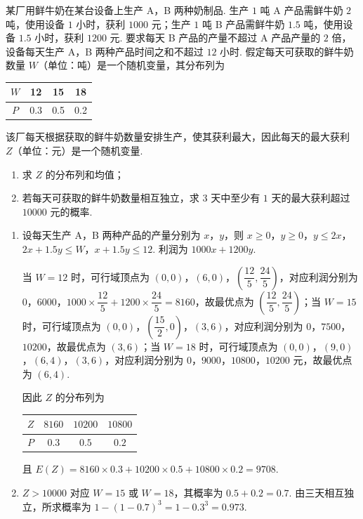 \begin{problem}
某厂用鲜牛奶在某台设备上生产 A，B 两种奶制品. 生产 \(1\) 吨 A 产品需鲜牛奶 \(2\) 吨，使用设备 \(1\) 小时，获利 \(1000\) 元；生产 \(1\) 吨 B 产品需鲜牛奶 \(1.5\) 吨，使用设备 \(1.5\) 小时，获利 \(1200\) 元. 要求每天 B 产品的产量不超过 A 产品产量的 \(2\) 倍，设备每天生产 A，B 两种产品时间之和不超过 \(12\) 小时. 假定每天可获取的鲜牛奶数量 \(W\)（单位：吨）是一个随机变量，其分布列为

\begin{center}
\renewcommand{\arraystretch}{1.2}
\begin{tabular}{|c|c|c|c|}
\hline
\(W\) & 12 & 15 & 18 \\
\hline
\(P\) & 0.3 & 0.5 & 0.2 \\
\hline
\end{tabular}
\end{center}

该厂每天根据获取的鲜牛奶数量安排生产，使其获利最大，因此每天的最大获利 \(Z\)（单位：元）是一个随机变量.

\begin{enumerate}
\item 求 \(Z\) 的分布列和均值；
\item 若每天可获取的鲜牛奶数量相互独立，求 \(3\) 天中至少有 \(1\) 天的最大获利超过 \(10000\) 元的概率.
\end{enumerate}
\end{problem}

\begin{solution}
\begin{enumerate}
\item
设每天生产 A，B 两种产品的产量分别为 \(x\)，\(y\)，则
\(x\geqslant0\)，\(y\geqslant0\)，\(y\leqslant2x\)，\(2x+1.5y\leqslant W\)，\(x+1.5y\leqslant12\).
利润为 \(1000x+1200y\).

当 \(W=12\) 时，可行域顶点为 \((0,0)\)，\((6,0)\)，\(\left(\dfrac{12}{5},\dfrac{24}{5}\right)\)，对应利润分别为 \(0\)，\(6000\)，\(1000\times\dfrac{12}{5}+1200\times\dfrac{24}{5}=8160\)，故最优点为 \(\left(\dfrac{12}{5},\dfrac{24}{5}\right)\)；当 \(W=15\) 时，可行域顶点为 \((0,0)\)，\(\left(\dfrac{15}{2},0\right)\)，\((3,6)\)，对应利润分别为 \(0\)，\(7500\)，\(10200\)，故最优点为 \((3,6)\)；当 \(W=18\) 时，可行域顶点为 \((0,0)\)，\((9,0)\)，\((6,4)\)，\((3,6)\)，对应利润分别为 \(0\)，\(9000\)，\(10800\)，\(10200\) 元，故最优点为 \((6,4)\).

因此 \(Z\) 的分布列为
\begin{center}
\begin{tabular}{c|ccc}
\(Z\)&\(8160\)&\(10200\)&\(10800\)\\\hline
\(P\)&\(0.3\)&\(0.5\)&\(0.2\)
\end{tabular}
\end{center}
且
\(E(Z)=8160\times0.3+10200\times0.5+10800\times0.2=9708\).

\item \(Z>10000\) 对应 \(W=15\) 或 \(W=18\)，其概率为 \(0.5+0.2=0.7\). 由三天相互独立，所求概率为
\(1-(1-0.7)^3=1-0.3^3=0.973\).
\end{enumerate}
\end{solution}

